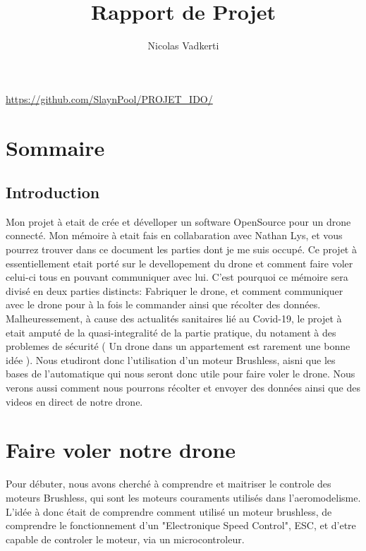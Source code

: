 \documentclass[10pt,a4paper]{article}
\title{Rapport de Projet}
\author{Nicolas Vadkerti}
\date{}
\begin{document}
\maketitle


\url{https://github.com/SlaynPool/PROJET_IDO/}
\section*{Sommaire}
\tableofcontents
\setcounter{tocdepth}{2}


\newpage
{}        
\begin{center}

\section*{Introduction}
Mon projet à etait de crée et dévelloper un software OpenSource pour un drone connecté. Mon mémoire à etait fais en collabaration avec Nathan Lys, et vous pourrez trouver dans ce document les parties dont je me suis occupé. Ce projet à essentiellement etait porté sur le devellopement du drone et comment faire voler celui-ci tous en pouvant communiquer avec lui. C'est pourquoi ce mémoire sera divisé en deux parties distincts: Fabriquer le drone, et comment communiquer avec le drone pour à la fois le commander ainsi que récolter des données.  Malheuressement, à cause des actualités sanitaires lié au Covid-19, le projet à etait amputé de la quasi-integralité de la partie pratique, du notament à des problemes de sécurité ( Un drone dans un appartement est rarement une bonne idée ). Nous etudiront donc l'utilisation d'un moteur Brushless, aisni que les bases de l'automatique qui nous seront donc utile pour faire voler le drone. Nous verons aussi comment nous pourrons récolter et envoyer des données ainsi que des videos en direct de notre drone.   \\


\end{center}
\newpage

\section{Faire voler notre drone} 
Pour débuter, nous avons cherché à comprendre et maitriser le controle des moteurs Brushless, qui sont les moteurs couraments utilisés dans l'aeromodelisme. L'idée à donc était de comprendre comment utilisé un moteur brushless, de comprendre le fonctionnement d'un "Electronique Speed Control", ESC, et d'etre capable de controler le moteur, via un microcontroleur.
\end{document}
